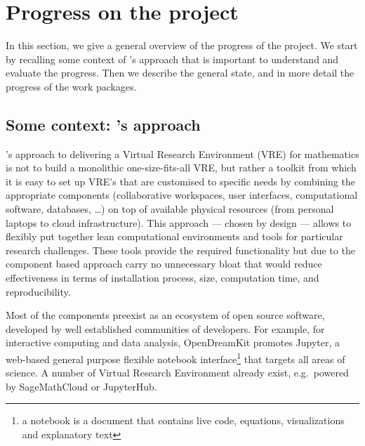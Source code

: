 \documentclass{deliverablereport}
\author{Nicolas M. Thiéry, Benoît Pilorget, et al.}
\begin{document}
\enlargethispage{4ex}
\maketitle
\githubissuedescription
\tableofcontents\newpage






\section{Progress on the project}

In this section, we give a general overview of the progress of the
project. We start by recalling some context of \ODK's
approach that is important to understand and evaluate the
progress. Then we describe the general state, and in more detail
the progress of the work packages.

\subsection{Some context: \ODK's approach}
\ODK's approach to delivering a Virtual Research Environment (VRE) for
mathematics is not to build a monolithic one-size-fits-all VRE, but
rather a toolkit from which it is easy to set up VRE's that are
customised to specific needs by combining the appropriate components
(collaborative workspaces, user interfaces, computational software,
databases, \dots) on top of available physical resources (from
personal laptops to cloud infrastructure). This approach --- chosen by
design --- allows to flexibly put together lean computational
environments and tools for particular research challenges. These tools
provide the required functionality but due to the component based
approach carry no unnecessary bloat that would reduce effectiveness in
terms of installation process, size, computation time, and
reproducibility.

Most of the components preexist as an ecosystem of open source
software, developed by well established communities of developers. For
example, for interactive computing and data analysis, OpenDreamKit
promotes Jupyter, a web-based general purpose flexible notebook
interface\footnote{a notebook is a document that contains live code,
  equations, visualizations and explanatory text} that targets all
areas of science. A number of Virtual Research Environment already
exist, e.g.\ powered by SageMathCloud or JupyterHub.
\end{document}
